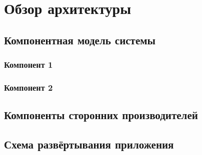 \chapter{Обзор архитектуры}
	\label{chapter4}

	\section{Компонентная модель системы}
		\subsection{Компонент 1}
		
		\subsection{Компонент 2}
	\section{Компоненты сторонних производителей}

	\section{Схема развёртывания приложения}
